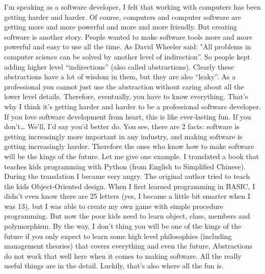 I’m speaking as a software developer, I felt that working with computers has been getting harder and harder. Of course, computers and computer software are getting more and more powerful and more and more friendly. But creating software is another story. People wanted to make software tools more and more powerful and easy to use all the time. As David Wheeler said: "All problems in computer science can be solved by another level of indirection”. So people kept adding higher level “indirections” (also called abstractions). Clearly these abstractions have a lot of wisdom in them, but they are also “leaky”. As a professional you cannot just use the abstraction without caring about all the lower level details. Therefore, eventually, you have to know everything. That’s why I think it’s getting harder and harder to be a professional software developer. If you love software development from heart, this is like ever-lasting fun. If you don’t… We’ll, I’d say you’d better do. You see, there are 2 facts: software is getting increasingly more important in any industry, and making software is getting increasingly harder. Therefore the ones who know how to make software will be the kings of the future.
Let me give one example. I translated a book that teaches kids programming with Python (from English to Simplified Chinese). During the translation I became very angry. The original author tried to teach the kids Object-Oriented design. When I first learned programming in BASIC, I didn’t even know there are 25 letters (yes, I became a little bit smarter when I was 13), but I was able to create my own game with simple procedure programming. But now the poor kids need to learn object, class, members and polymorphism.
By the way, I don’t thing you will be one of the kings of the future if you only expect to learn some high level philosophies (including management theories) that covers everything and even the future. Abstractions do not work that well here when it comes to making software. All the really useful things are in the detail. Luckily, that’s also where all the fun is.